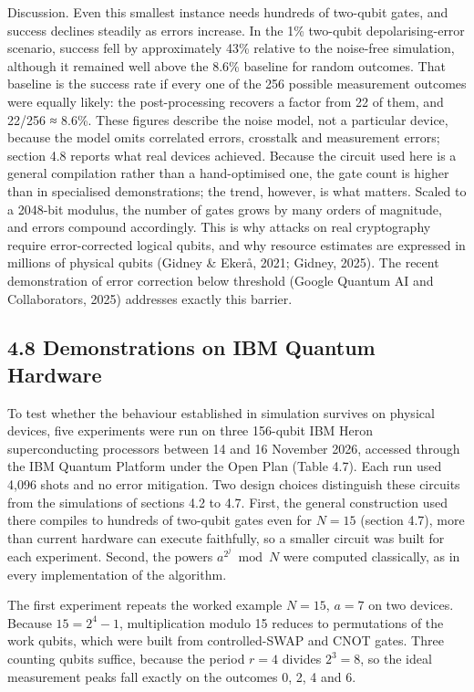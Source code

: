 \documentclass[12pt,oneside]{report}
\begin{document}
Discussion. Even this smallest instance needs hundreds of two-qubit gates, and success declines steadily as errors increase. In the 1\% two-qubit depolarising-error scenario, success fell by approximately 43\% relative to the noise-free simulation, although it remained well above the 8.6\% baseline for random outcomes. That baseline is the success rate if every one of the 256 possible measurement outcomes were equally likely: the post-processing recovers a factor from 22 of them, and 22/256 ≈ 8.6\%. These figures describe the noise model, not a particular device, because the model omits correlated errors, crosstalk and measurement errors; section 4.8 reports what real devices achieved. Because the circuit used here is a general compilation rather than a hand-optimised one, the gate count is higher than in specialised demonstrations; the trend, however, is what matters. Scaled to a 2048-bit modulus, the number of gates grows by many orders of magnitude, and errors compound accordingly. This is why attacks on real cryptography require error-corrected logical qubits, and why resource estimates are expressed in millions of physical qubits (Gidney \& Ekerå, 2021; Gidney, 2025). The recent demonstration of error correction below threshold (Google Quantum AI and Collaborators, 2025) addresses exactly this barrier.
\par

\subsection*{4.8 Demonstrations on IBM Quantum Hardware}

To test whether the behaviour established in simulation survives on physical devices, five experiments were run on three 156-qubit IBM Heron superconducting processors between 14 and 16 November 2026, accessed through the IBM Quantum Platform under the Open Plan (Table 4.7). Each run used 4,096 shots and no error mitigation. Two design choices distinguish these circuits from the simulations of sections 4.2 to 4.7. First, the general construction used there compiles to hundreds of two-qubit gates even for $N = 15$ (section 4.7), more than current hardware can execute faithfully, so a smaller circuit was built for each experiment. Second, the powers $a^{2^{j}} \bmod N$ were computed classically, as in every implementation of the algorithm.
\par

The first experiment repeats the worked example $N = 15$, $a = 7$ on two devices. Because $15 = 2^{4} - 1$, multiplication modulo 15 reduces to permutations of the work qubits, which were built from controlled-SWAP and CNOT gates. Three counting qubits suffice, because the period $r = 4$ divides $2^{3} = 8$, so the ideal measurement peaks fall exactly on the outcomes 0, 2, 4 and 6.
\par
\end{document}
